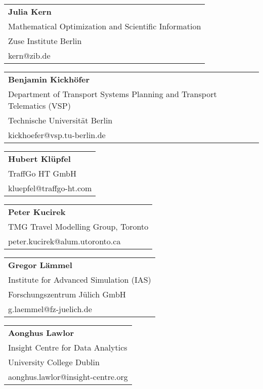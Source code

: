 \begin{tabular}[width=0.48\textwidth]{@{}l}
\textbf{Julia Kern} \\
Mathematical Optimization and Scientific Information \\
Zuse Institute Berlin \\
kern@zib.de \\
\end{tabular}

\begin{tabular}[width=0.48\textwidth]{@{}l}
\textbf{Benjamin Kickhöfer} \\
Department of Transport Systems Planning and Transport Telematics (VSP) \\
Technische Universität Berlin \\
kickhoefer@vsp.tu-berlin.de \\
\end{tabular}

\begin{tabular}[width=0.48\textwidth]{@{}l}
\textbf{Hubert Klüpfel} \\
TraffGo HT GmbH\\
kluepfel@traffgo-ht.com \\
\end{tabular}

\begin{tabular}[width=0.48\textwidth]{@{}l}
\textbf{Peter Kucirek} \\
TMG Travel Modelling Group, Toronto \\
peter.kucirek@alum.utoronto.ca  \\
\end{tabular}

\begin{tabular}[width=0.48\textwidth]{@{}l}
\textbf{Gregor Lämmel} \\
Institute for Advanced Simulation (IAS) \\
Forschungszentrum Jülich GmbH \\
g.laemmel@fz-juelich.de \\
\end{tabular}

\begin{tabular}[width=0.48\textwidth]{@{}l}
\textbf{Aonghus Lawlor} \\
Insight Centre for Data Analytics \\
University College Dublin \\
aonghus.lawlor@insight-centre.org \\
\end{tabular}

